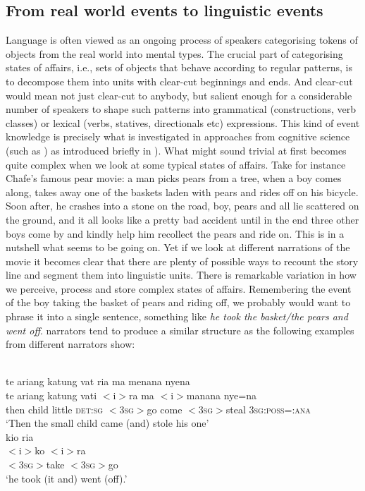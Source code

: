 \subsection{From real world events to linguistic events}\label{sec:real-world-linguistic-events}

Language is often viewed as an ongoing process of speakers categorising tokens of objects from the real world into mental types. The crucial part of categorising states of affairs, i.e., sets of objects that behave according to regular patterns, is to decompose them into units with clear-cut beginnings and ends. And clear-cut would mean not just clear-cut to anybody, but salient enough for a considerable number of speakers to shape such patterns into grammatical (constructions, verb classes) or lexical (verbs, statives, directionals etc) expressions. This kind of event knowledge \citep{Elman2009} is precisely what is investigated in approaches from cognitive science (such as \citealt{newtson1976perceptual, zacks2007event, zacks2010we}) as introduced briefly in ). What might sound trivial at first becomes quite complex when we look at some typical states of affairs. Take for instance Chafe's famous pear movie: a man picks pears from a tree, when a boy comes along, takes away one of the baskets laden with pears and rides off on his bicycle. Soon after, he crashes into a stone on the road, boy, pears and all lie scattered on the ground, and it all looks like a pretty bad accident until in the end three other boys come by and kindly help him recollect the pears and ride on. This is in a nutshell what seems to be going on. Yet if we look at different narrations of the movie it becomes clear that there are plenty of possible ways to recount the story line and segment them into linguistic units. There is remarkable variation in how we perceive, process and store complex states of affairs. Remembering the event of the boy taking the basket of pears and riding off, we probably would want to phrase it into a single sentence, something like \textit{he took the basket/the pears and went off}.  narrators tend to produce a similar structure as the following examples from different narrators show:

\ea
{}\\
\ea
\glll te ariang katung vat ria ma menana nyena \\
te ariang katung vati $<$i$>$ra ma $<$i$>$manana nye=na \\
then child little \textsc{det}:\textsc{sg} $<$\textsc{3}\textsc{sg}$>$go come $<$\textsc{3}\textsc{sg}$>$steal \textsc{3}\textsc{sg}:\textsc{poss}=:\textsc{ana}\\
\glft `Then the small child came (and) stole his one'\\
\ex
\glll kio ria\\
$<$i$>$ko $<$i$>$ra \\
$<$\textsc{3}\textsc{sg}$>$take $<$\textsc{3}\textsc{sg}$>$go\\
\glft `he took (it and) went (off).'\\ 
\z
\z


